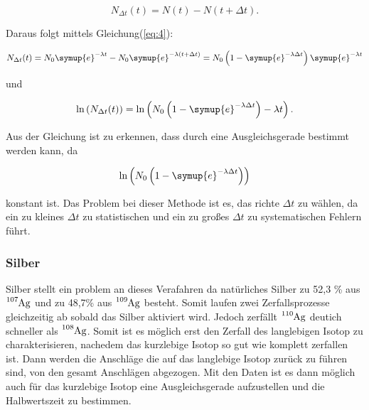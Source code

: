 \begin{equation}
   N_{\Delta t}(t) = N(t) - N(t + \Delta t) . \nonumber
\end{equation}

\noindent Daraus folgt mittels Gleichung(\ref{eq:4}):

\begin{equation}
   N_{\Delta t}(t) = N_0 \symup{e}^{ - \lambda t} - N_0 \symup{e}^{- \lambda \left( t + \Delta t \right) } = N_0 \left( 1 - \symup{e}^{-\lambda \Delta t} \right) \symup{e}^{-\lambda t} \nonumber
\end{equation}

\noindent und

\begin{equation}
   \text{ln} \left( N_{\Delta t}(t)\right) = \text{ln} \left( N_0 \left( 1- \symup{e}^{-\lambda \Delta t}\right) -\lambda t \right) .
\label{eq:5}
\end{equation}

\noindent Aus der Gleichung ist zu erkennen, dass \lambda durch eine Ausgleichsgerade bestimmt werden kann, da 

\begin{equation}
   \text{ln}\left(N_0\left(1- \symup{e}^{-\lambda\Delta t}\right)  \right) \nonumber
\end{equation}

\noindent konstant ist. Das Problem bei dieser Methode ist es, das richte $\Delta t$ zu wählen, da ein zu kleines $\Delta t$ zu statistischen und 
ein zu großes $\Delta t$ zu systematischen Fehlern führt.

\subsubsection{Silber}

\noindent Silber stellt ein problem an dieses Verafahren da natürliches Silber zu 52,3 \% aus $\ce{^{107}\text{Ag}}$ und zu 48,7\% aus $\ce{^{109}\text{Ag}}$ 
besteht. Somit laufen zwei Zerfallsprozesse gleichzeitig ab sobald das Silber aktiviert wird. Jedoch zerfällt $\ce{^{110}\text{Ag}}$ deutich schneller 
als $\ce{^{108}\text{Ag}}$. Somit ist es möglich erst den Zerfall des langlebigen Isotop zu charakterisieren, nachedem das kurzlebige Isotop so gut 
wie komplett zerfallen ist. Dann werden die Anschläge die auf das langlebige Isotop zurück zu führen sind, von den gesamt Anschlägen abgezogen. Mit 
den Daten ist es dann möglich auch für das kurzlebige Isotop eine Ausgleichsgerade aufzustellen und die Halbwertszeit zu bestimmen.

